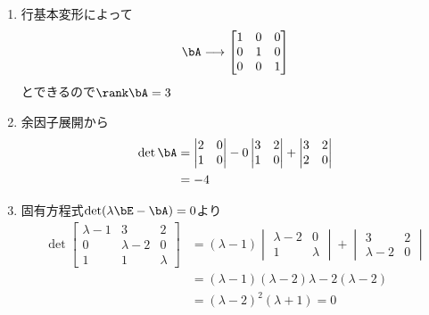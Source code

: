 \begin{ans*}
  ${}$
  \begin{enumerate}[label=(\arabic*)]
    \item 行基本変形によって
    \begin{gather}
      \bA \longrightarrow
      \begin{bmatrix}
        1& 0& 0 \\
        0& 1& 0 \\
        0& 0& 1 
      \end{bmatrix}
    \end{gather}
    とできるので$\rank \bA = 3$
    \item 余因子展開から
    \begin{align}
      \det \bA
      &=
      \begin{vmatrix}
        2& 0 \\
        1& 0
      \end{vmatrix}
      - 0
      \begin{vmatrix}
        3& 2 \\
        1& 0
      \end{vmatrix}
      +
      \begin{vmatrix}
        3& 2 \\
        2& 0
      \end{vmatrix} \\
      &= -4
    \end{align}
    \item 固有方程式$\det(\lambda\bE - \bA) = 0$より
    \begin{align}
      \det
      \begin{bmatrix}
        \lambda-1& 3& 2 \\
        0& \lambda-2& 0 \\
        1& 1& \lambda
      \end{bmatrix}
      &= (\lambda -1)
      \begin{vmatrix}
        \lambda-2 & 0 \\
        1& \lambda
      \end{vmatrix}
      +
      \begin{vmatrix}
        3& 2 \\
        \lambda-2& 0
      \end{vmatrix} \\
      &= (\lambda-1)(\lambda-2)\lambda - 2(\lambda-2) \\
      &= (\lambda-2)^2(\lambda+1) = 0 \\
    \end{align}

\end{enumerate}
\end{ans*}
